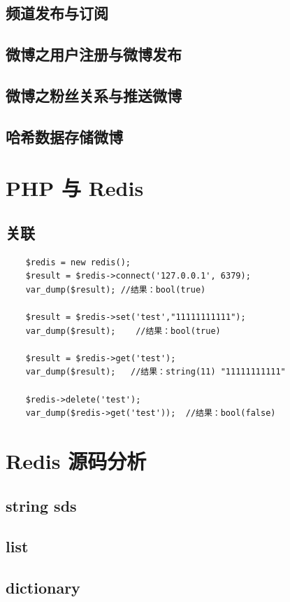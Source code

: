 \documentclass[UTF8,a4paper,12pt]{ctexbook}
\begin{document}
	\section{频道发布与订阅}
	
	\section{微博之用户注册与微博发布}
	
	\section{微博之粉丝关系与推送微博}
	
	\section{哈希数据存储微博}



\chapter{PHP 与 Redis}
	\section{关联}
		\begin{lstlisting}
	$redis = new redis();  
	$result = $redis->connect('127.0.0.1', 6379);  
	var_dump($result); //结果：bool(true)  
	
	$result = $redis->set('test',"11111111111");  
	var_dump($result);    //结果：bool(true)  
	
	$result = $redis->get('test');  
	var_dump($result);   //结果：string(11) "11111111111"  
	
	$redis->delete('test');  
	var_dump($redis->get('test'));  //结果：bool(false)  
		\end{lstlisting}	
		
		
		

\chapter{Redis 源码分析}
	\section{string sds}
	
	\section{list}
	
	\section{dictionary}	    
	
\end{document}
